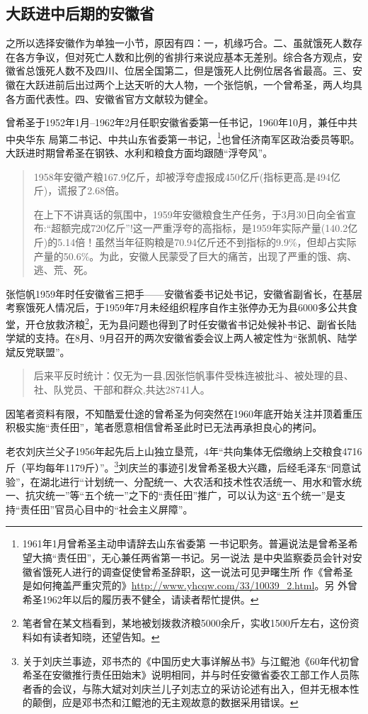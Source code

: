 \subsection{大跃进中后期的安徽省}

之所以选择安徽作为单独一小节，原因有四：一，机缘巧合。二、虽就饿死人数存在各方争议，但对死亡人数和比例的省排行来说应基本无差别。综合各方观点，安徽省总饿死人数不及四川、位居全国第二，但是饿死人比例位居各省最高。三、安徽在大跃进前后出过两个上达天听的大人物，一个张恺帆，一个曾希圣，两人均具各方面代表性。四、安徽省官方文献较为健全。

曾希圣于1952年1月--1962年2月任职安徽省委第一任书记，1960年10月，兼任中共中央华东
局第二书记、中共山东省委第一书记，\footnote{1961年1月曾希圣主动申请辞去山东省委第
  一书记职务。普遍说法是曾希圣希望大搞“责任田”，无心兼任两省第一书记。另一说法
  是中央监察委员会针对安徽省饿死人进行的调查促使曾希圣辞职，这一说法可见尹曙生所
  作《曾希圣是如何掩盖严重灾荒的》\url{http://www.yhcqw.com/33/10039_2.html}。另
  外曾希圣1962年以后的履历表不健全，请读者帮忙提供。}也曾任济南军区政治委员等职。
大跃进时期曾希圣在钢铁、水利和粮食方面均跟随“浮夸风”。
\begin{quotation} 1958年安徽产粮167.9亿斤，却被浮夸虚报成450亿斤(指标更高,是494亿斤)，谎报了2.68倍。\cite{zhangfandang}

  在上下不讲真话的氛围中，1959年安徽粮食生产任务，于3月30日向全省宣布:“超额完成720亿斤”!这一严重浮夸的高指标，是1959年实际产量(140.2亿斤)的5.14倍！虽然当年征购粮是70.94亿斤还不到指标的9.9\%，但却占实际产量的50.6\%。为此，安徽人民蒙受了巨大的痛苦，出现了严重的饿、病、逃、荒、死。\cite{zhang1959}
\end{quotation}

张恺帆1959年时任安徽省三把手——安徽省委书记处书记，安徽省副省长，在基层考察饿死人情况后，于1959年7月未经组织程序自作主张停办无为县6000多公共食堂，开仓放救济粮\footnote{笔者曾在某文档看到，某地被划拨救济粮5000余斤，实收1500斤左右，这份资料如有读者知晓，还望告知。}，无为县问题也得到了时任安徽省书记处候补书记、副省长陆学斌的支持。在8月、9月召开的两次安徽省委会议上两人被定性为“张凯帆、陆学斌反党联盟”。
\begin{quotation}后来平反时统计：仅无为一县,因张恺帆事件受株连被批斗、被处理的县、社、队党员、干部和群众,共达28741人。\cite{zhang1959}
\end{quotation}

因笔者资料有限，不知酷爱仕途的曾希圣为何突然在1960年底开始关注并顶着重压积极实施“责任田”，笔者愿意相信曾希圣此时已无法再承担良心的拷问。

老农刘庆兰父子1956年起先后上山独立垦荒，4年“共向集体无偿缴纳上交粮食4716斤（平均每年1179斤）”。\cite{anhuiliushi}\footnote{关于刘庆兰事迹，邓书杰的《中国历史大事详解丛书》与江鲲池《60年代初曾希圣在安徽推行责任田始末》说明相同，并与时任安徽省委农工部工作人员陈者香的会议，与陈大斌对刘庆兰儿子刘志立的采访论述有出入，但并无根本性的颠倒，应是邓书杰和江鲲池的无主观故意的数据采用错误。}刘庆兰的事迹引发曾希圣极大兴趣，后经毛泽东“同意试验”，在湖北进行“计划统一、分配统一、大农活和技术性农活统一、用水和管水统一、抗灾统一”等“五个统一”之下的“责任田”推广，可以认为这“五个统一”是支持“责任田”官员心目中的“社会主义屏障”。

